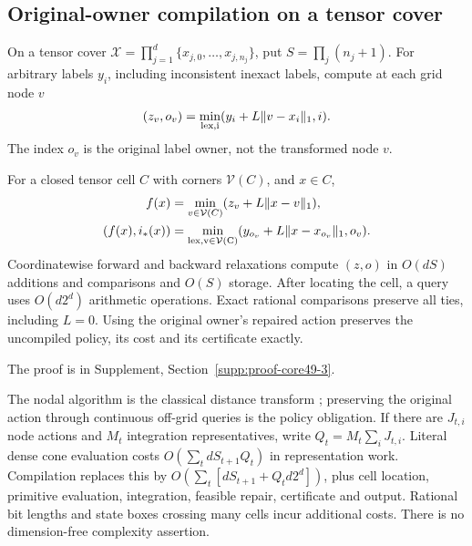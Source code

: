 \subsection{Original-owner compilation on a tensor cover}
On a tensor cover $\mathcal X=\prod_{j=1}^d\{x_{j,0},\ldots,x_{j,n_j}\}$, put $S=\prod_j(n_j+1)$. For arbitrary labels $y_i$, including inconsistent inexact labels, compute at each grid node $v$
\[
 (z_v,o_v)=\min_{\rm lex,i}(y_i+L\|v-x_i\|_1,i).
\]
The index $o_v$ is the original label owner, not the transformed node $v$.

\begin{theorem}\label{thm:compile49}
For a closed tensor cell $C$ with corners $\mathcal V(C)$, and $x\in C$,
\begin{align}\label{eq:compile49}
 f(x)&=\min_{v\in\mathcal V(C)}(z_v+L\|x-v\|_1),\\
 (f(x),i_*(x))&=\min_{\rm lex,v\in\mathcal V(C)}
 (y_{o_v}+L\|x-x_{o_v}\|_1,o_v).\notag
\end{align}
Coordinatewise forward and backward relaxations compute $(z,o)$ in $O(dS)$ additions and comparisons and $O(S)$ storage. After locating the cell, a query uses $O(d2^d)$ arithmetic operations. Exact rational comparisons preserve all ties, including $L=0$. Using the original owner's repaired action preserves the uncompiled policy, its cost and its certificate exactly.
\end{theorem}
\noindent The proof is in Supplement, Section~\ref{supp:proof-core49-3}.


The nodal algorithm is the classical distance transform \citep{felzenszwalb2012}; preserving the original action through continuous off-grid queries is the policy obligation. If there are $J_{t,i}$ node actions and $M_t$ integration representatives, write $Q_t=M_t\sum_iJ_{t,i}$. Literal dense cone evaluation costs $O(\sum_t dS_{t+1}Q_t)$ in representation work. Compilation replaces this by $O(\sum_t[dS_{t+1}+Q_td2^d])$, plus cell location, primitive evaluation, integration, feasible repair, certificate and output. Rational bit lengths and state boxes crossing many cells incur additional costs. There is no dimension-free complexity assertion.

